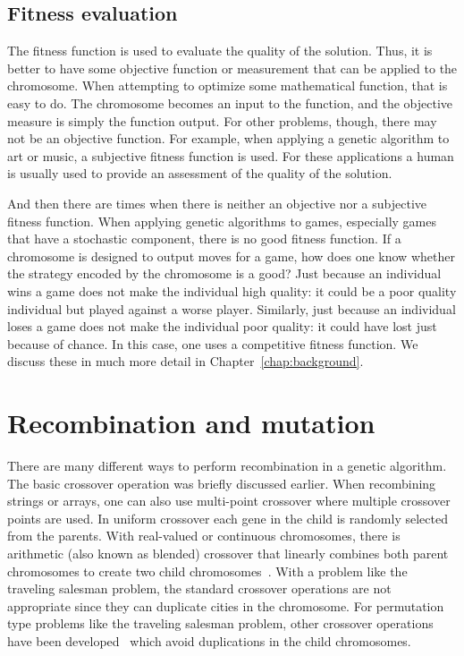 \subsection{Fitness evaluation}

The fitness function is used to evaluate the quality of the solution. Thus, it
is better to have some objective function or measurement that can be applied to
the chromosome. When attempting to optimize some mathematical function, that is
easy to do. The chromosome becomes an input to the function, and the objective
measure is simply the function output. For other problems, though, there may not
be an objective function. For example, when applying a genetic algorithm to art
or music, a subjective fitness function is used. For these applications a human
is usually used to provide an assessment of the quality of the solution.

And then there are times when there is neither an objective nor a subjective
fitness function. When applying genetic algorithms to games, especially games
that have a stochastic component, there is no good fitness function. If a
chromosome is designed to output moves for a game, how does one know whether
the strategy encoded by the chromosome is a good? Just because an individual
wins a game does not make the individual high quality: it could be a poor
quality individual but played against a worse player. Similarly, just because an
individual loses a game does not make the individual poor quality: it could have
lost just because of chance. In this case, one uses a competitive fitness
function. We discuss these in much more detail in Chapter~\ref{chap:background}.

\section{Recombination and mutation} \label{2-recombination}

There are many different ways to perform recombination in a genetic algorithm.
The basic crossover operation was briefly discussed earlier. When recombining
strings or arrays, one can also use multi-point crossover where multiple
crossover points are used. In uniform crossover each gene in the child is
randomly selected from the parents. With real-valued or continuous chromosomes,
there is arithmetic (also known as blended) crossover that linearly combines
both parent chromosomes to create two child
chromosomes~\cite{haupt2004practical}. With a problem like the traveling
salesman problem, the standard crossover operations are not appropriate since
they can duplicate cities in the chromosome. For permutation type problems like
the traveling salesman problem, other crossover operations have been
developed~\cite{goldberg1989genetic} which avoid duplications in the child
chromosomes.
